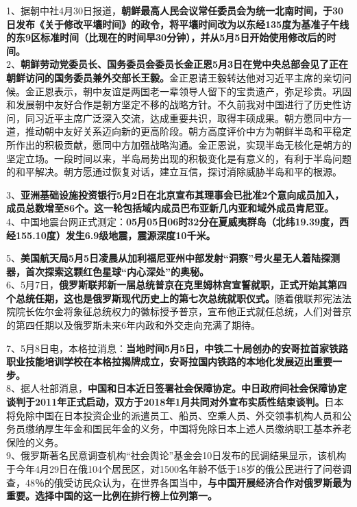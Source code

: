 1、据朝中社4月30日报道，{\textbf{朝鲜最高人民会议常任委员会为统一北南时间，于30日发布《关于修改平壤时间》的政令，将平壤时间改为以东经135度为基准子午线的东9区标准时间（比现在的时间早30分钟），并从5月5日开始使用修改后的时间。}}\\
2、{\textbf{朝鲜劳动党委员长、国务委员会委员长金正恩5月3日在党中央总部会见了正在朝鲜访问的国务委员兼外交部长王毅。}}金正恩请王毅转达他对习近平主席的亲切问候。金正恩表示，朝中友谊是两国老一辈领导人留下的宝贵遗产，弥足珍贵。巩固和发展朝中友好合作是朝方坚定不移的战略方针。不久前我对中国进行了历史性访问，同习近平主席广泛深入交流，达成重要共识，取得丰硕成果。朝方愿同中方一道，推动朝中友好关系迈向新的更高阶段。朝方高度评价中方为朝鲜半岛和平稳定所作出的积极贡献，愿同中方加强战略沟通。金正恩说，实现半岛无核化是朝方的坚定立场。一段时间以来，半岛局势出现的积极变化是有意义的，有利于半岛问题的和平解决。朝方愿通过恢复对话，建立互信，探讨消除威胁半岛和平的根源。

3、{\textbf{亚洲基础设施投资银行5月2日在北京宣布其理事会已批准2个意向成员加入，成员总数增至86个。这一轮包括域内成员巴布亚新几内亚和域外成员肯尼亚。}}\\
4、中国地震台网正式测定：{\textbf{05月05日06时32分在夏威夷群岛（北纬19.39度，西经155.10度）发生6.9级地震，震源深度10千米。}}

5、{\textbf{美国航天局5月5日凌晨从加利福尼亚州中部发射``洞察''号火星无人着陆探测器，首次探索这颗红色星球``内心深处''的奥秘。}}\\
6、5月7日，{\textbf{俄罗斯联邦新一届总统普京在克里姆林宫宣誓就职，正式开始其第四个总统任期，这也是俄罗斯现代历史上的第七次总统就职仪式。}}随着俄联邦宪法法院院长佐尔金将象征总统权力的徽标授予普京，宣布他正式就任总统，人们对普京的第四任期以及俄罗斯未来6年内政和外交走向充满了期待。

7、5月8日电，本格拉消息：{\textbf{当地时间5月5日，中铁二十局创办的安哥拉首家铁路职业技能培训学校在本格拉揭牌成立，安哥拉国内铁路的本地化发展迈出重要一步。}}\\
8、据人社部消息，{\textbf{中国和日本近日签署社会保障协定。中日政府间社会保障协定谈判于2011年正式启动，双方于2018年1月共同对外宣布实质性结束谈判。}}日本将免除中国在日本投资企业的派遣员工、船员、空乘人员、外交领事机构人员和公务员缴纳厚生年金和国民年金的义务，中国将免除日本上述人员缴纳职工基本养老保险的义务。\\
9、俄罗斯著名民意调查机构``社会舆论''基金会10日发布的民调结果显示，该机构于今年4月29日在俄104个居民区，对1500名年龄不低于18岁的俄公民进行了问卷调查，48％的俄受访民众认为，在世界各国当中，{\textbf{与中国开展经济合作对俄罗斯最为重要。选择中国的这一比例在排行榜上位列第一。}}


